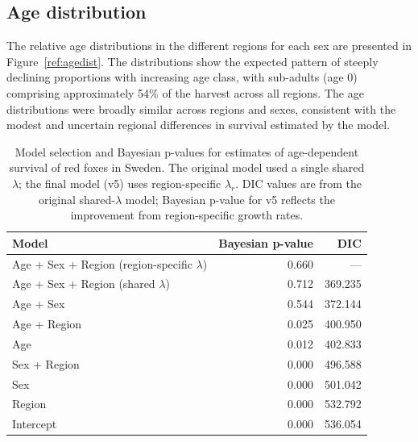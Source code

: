 \documentclass[12pt, a4paper]{article}
\begin{document}
\subsection*{Age distribution}

The relative age distributions in the different regions for each sex are presented in Figure~\ref{ref:agedist}. The distributions show the expected pattern of steeply declining proportions with increasing age class, with sub-adults (age 0) comprising approximately 54\% of the harvest across all regions. The age distributions were broadly similar across regions and sexes, consistent with the modest and uncertain regional differences in survival estimated by the model.


\begin{table}[!htbp]
\centering
\captionsetup{font=scriptsize}
\caption{Model selection and Bayesian p-values for estimates of age-dependent
         survival of red foxes in Sweden. The original model used a single
         shared $\lambda$; the final model (v5) uses region-specific
         $\lambda_r$. DIC values are from the original shared-$\lambda$ model;
         Bayesian p-value for v5 reflects the improvement from region-specific
         growth rates.}
\label{table:DICBP}
\scriptsize
\begin{tabular}{lrr}
\toprule
Model & Bayesian p-value & DIC \\
\midrule
Age + Sex + Region (region-specific $\lambda$) & 0.660 & --- \\
Age + Sex + Region (shared $\lambda$)          & 0.712 & 369.235 \\
Age + Sex                                      & 0.544 & 372.144 \\
Age + Region                                   & 0.025 & 400.950 \\
Age                                            & 0.012 & 402.833 \\
Sex + Region                                   & 0.000 & 496.588 \\
Sex                                            & 0.000 & 501.042 \\
Region                                         & 0.000 & 532.792 \\
Intercept                                      & 0.000 & 536.054 \\
\bottomrule
\end{tabular}
\end{table}
\end{document}
